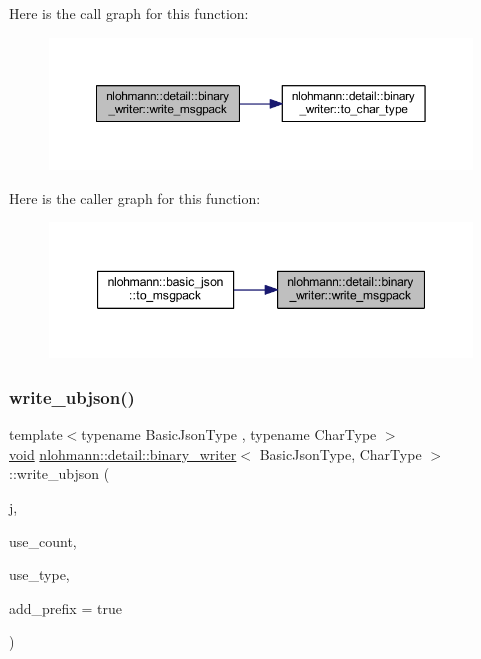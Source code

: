 Here is the call graph for this function\+:
\nopagebreak
\begin{figure}[H]
\begin{center}
\leavevmode
\includegraphics[width=350pt]{classnlohmann_1_1detail_1_1binary__writer_ae4e0852b64102ce4b07d99f08f828b7c_cgraph}
\end{center}
\end{figure}
Here is the caller graph for this function\+:
\nopagebreak
\begin{figure}[H]
\begin{center}
\leavevmode
\includegraphics[width=347pt]{classnlohmann_1_1detail_1_1binary__writer_ae4e0852b64102ce4b07d99f08f828b7c_icgraph}
\end{center}
\end{figure}
\mbox{\label{classnlohmann_1_1detail_1_1binary__writer_a0f6c65053d859269f88eb4ebb0cd7060}} 
\subsubsection{\texorpdfstring{write\_ubjson()}{write\_ubjson()}}
{\footnotesize\ttfamily template$<$typename Basic\+Json\+Type , typename Char\+Type $>$ \\
\mbox{\hyperlink{namespacenlohmann_1_1detail_a59fca69799f6b9e366710cb9043aa77d}{void}} \mbox{\hyperlink{classnlohmann_1_1detail_1_1binary__writer}{nlohmann\+::detail\+::binary\+\_\+writer}}$<$ Basic\+Json\+Type, Char\+Type $>$\+::write\+\_\+ubjson (\begin{DoxyParamCaption}\item[{const Basic\+Json\+Type \&}]{j,  }\item[{const bool}]{use\+\_\+count,  }\item[{const bool}]{use\+\_\+type,  }\item[{const bool}]{add\+\_\+prefix = {\ttfamily true} }\end{DoxyParamCaption})\hspace{0.3cm}{\ttfamily [inline]}}


